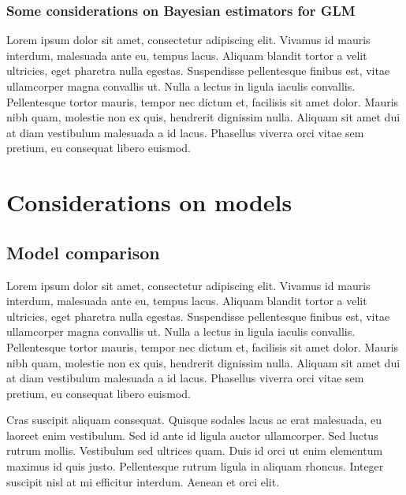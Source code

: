 \documentclass[a4paper, nobind]{templates/ociamthesis}
\theoremstyle{definition}
\theoremstyle{definition}
\theoremstyle{definition}
\theoremstyle{remark}
\begin{document}
\hypertarget{some-considerations-on-bayesian-estimators-for-glm}{%
\subsubsection{Some considerations on Bayesian estimators for GLM}\label{some-considerations-on-bayesian-estimators-for-glm}}

Lorem ipsum dolor sit amet, consectetur adipiscing elit. Vivamus id mauris interdum, malesuada ante eu, tempus lacus. Aliquam blandit tortor a velit ultricies, eget pharetra nulla egestas. Suspendisse pellentesque finibus est, vitae ullamcorper magna convallis ut. Nulla a lectus in ligula iaculis convallis. Pellentesque tortor mauris, tempor nec dictum et, facilisis sit amet dolor. Mauris nibh quam, molestie non ex quis, hendrerit dignissim nulla. Aliquam sit amet dui at diam vestibulum malesuada a id lacus. Phasellus viverra orci vitae sem pretium, eu consequat libero euismod.

\newpage

\hypertarget{chap:considerations-on-models}{%
\section{Considerations on models}\label{chap:considerations-on-models}}

\hypertarget{chap:model-comparison}{%
\subsection{Model comparison}\label{chap:model-comparison}}

Lorem ipsum dolor sit amet, consectetur adipiscing elit. Vivamus id mauris interdum, malesuada ante eu, tempus lacus. Aliquam blandit tortor a velit ultricies, eget pharetra nulla egestas. Suspendisse pellentesque finibus est, vitae ullamcorper magna convallis ut. Nulla a lectus in ligula iaculis convallis. Pellentesque tortor mauris, tempor nec dictum et, facilisis sit amet dolor. Mauris nibh quam, molestie non ex quis, hendrerit dignissim nulla. Aliquam sit amet dui at diam vestibulum malesuada a id lacus. Phasellus viverra orci vitae sem pretium, eu consequat libero euismod.

Cras suscipit aliquam consequat. Quisque sodales lacus ac erat malesuada, eu laoreet enim vestibulum. Sed id ante id ligula auctor ullamcorper. Sed luctus rutrum mollis. Vestibulum sed ultrices quam. Duis id orci ut enim elementum maximus id quis justo. Pellentesque rutrum ligula in aliquam rhoncus. Integer suscipit nisl at mi efficitur interdum. Aenean et orci elit.
\end{document}
